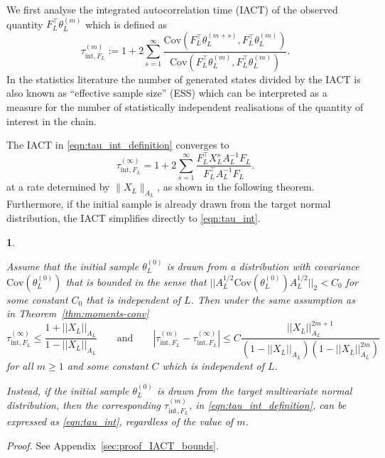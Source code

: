 \documentclass[11pt,english]{article}
\theoremstyle{plain}
\newtheorem{thm}{\protect\theoremname}[section]
\theoremstyle{plain}
\theoremstyle{plain}
\theoremstyle{plain}
\numberwithin{equation}{section}
\newcommand{\rev}[1]{#1}
\providecommand{\theoremname}{Theorem}
\begin{document}
We \rev{first} analyse the integrated autocorrelation  time (IACT) of the observed quantity $F_L^\top\theta_{L}^{(m)}$ which is defined as
\begin{equation}
	\tau_{\mathrm{int},F_L}^{(m)} :=1+2\sum_{s=1}^{\infty}\frac{\text{Cov}(F_L^\top\theta_{L}^{(m+s)},F_L^\top\theta_{L}^{(m)})}{\text{Cov}(F_L^\top\theta_{L}^{(m)},F_L^\top\theta_{L}^{(m)})}.
	\label{eqn:tau_int_definition}
\end{equation}
In the statistics literature the number of generated states divided by the IACT is also known as ``effective sample size'' (ESS) which can be interpreted as a measure for the number of statistically independent realisations of the quantity of interest in the chain. 
\rev{
The IACT in \eqref{eqn:tau_int_definition} converges to 
	\begin{equation}
	\rev{\tau^{(\infty)}_{\mathrm{int},F_L}}=1+2\sum_{s=1}^{\infty}\frac{F_L^\top X_{L}^{s}A_{L}^{-1}F_L}{F_L^\top A_{L}^{-1}F_L}.
	\label{eqn:tau_int}
\end{equation}
at a rate determined by $\|X_{L}\|_{A_{L}}$, as shown in the following theorem. 
Furthermore, if the initial sample is already drawn from the target normal distribution, the IACT simplifies directly to  \eqref{eqn:tau_int}.}
\begin{thm}
	\label{thm:IACT}

	\rev{Assume} 
	that the initial sample $\theta_L^{(0)}$ is drawn from a distribution with covariance $\mathrm{Cov}(\theta_L^{(0)})$ that is bounded in the sense that $||A_L^{1/2}\mathrm{Cov}(\theta_L^{(0)})A_L^{1/2}||_2<C_0$ for some constant $C_0$ that is independent of $L$. Then under the same assumption as in Theorem~\ref{thm:moments-conv}
	\begin{equation}
		\rev{\tau^{(\infty)}_{\mathrm{int},F_L}}\leq\frac{1+||X_{L}||_{A_{L}}}{1-||X_{L}||_{A_{L}}}\qquad\text{and} \qquad\left|\tau_{\mathrm{int},F_L}^{(m)}-\rev{\tau^{(\infty)}_{\mathrm{int},F_L}}\right|\le C\frac{||X_L||^{2m+1}_{A_L}}{(1-||X_L||_{A_L})(1-||X_L||_{A_L}^{2m})}
		\label{eqn:tau_int_bounds}
	\end{equation}
	for all $m\ge 1$ and some constant $C$ which is independent of $L$.
        
	\rev{Instead, if the initial sample $\theta_L^{(0)}$ is drawn from the target multivariate normal distribution, then the corresponding $\tau_{\mathrm{int},F_L}^{(m)}$, in \eqref{eqn:tau_int_definition}, can be expressed as \eqref{eqn:tau_int}, regardless of the value of $m$.}  
\end{thm}
\noindent\textit{Proof.} See Appendix~\ref{sec:proof_IACT_bounds}.\pagebreak
\end{document}
